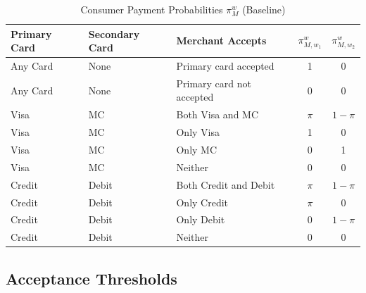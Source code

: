 \documentclass[main.tex]{subfiles}
\begin{document}
\begin{table}[ht]
    \centering
    \caption{Consumer Payment Probabilities $\pi^w_M$ (Baseline)}
    \label{tab:consumer-payment-probs-baseline}
    \small
    \begin{tabular}{lll cc}
        \toprule
        \textbf{Primary Card} & \textbf{Secondary Card} & \textbf{Merchant Accepts} & $\pi^w_{M,w_1}$ & $\pi^w_{M,w_2}$ \\
        \midrule
        Any Card & None  & Primary card accepted      & 1 & 0 \\
        Any Card & None  & Primary card not accepted  & 0 & 0 \\
        \midrule
        Visa & MC  & Both Visa and MC  & $\pi$ & $1-\pi$ \\
        Visa & MC  & Only Visa         & 1 & 0 \\
        Visa & MC  & Only MC           & 0 & 1 \\
        Visa & MC  & Neither           & 0 & 0 \\
        \midrule
        Credit  & Debit & Both Credit and Debit  & $\pi$ & $1-\pi$ \\
        Credit  & Debit & Only Credit           & $\pi$ & 0 \\
        Credit  & Debit & Only Debit          & 0 & $1-\pi$ \\
        Credit  & Debit & Neither             & 0 & 0 \\
        \bottomrule
    \end{tabular}
\end{table}

\subsection{Acceptance Thresholds}\label{subsec:oa-credit-multihoming}
\end{document}
